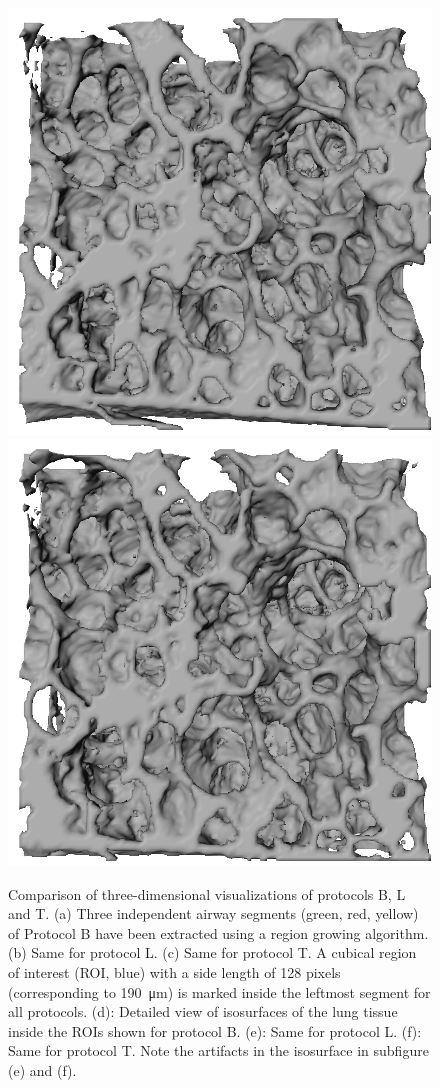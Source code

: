 \begin{figure}[htp]
		\includegraphics[width=\imagewidth]{img/comparisonBvsT/roiL}%
		\includegraphics[width=\imagewidth]{img/comparisonBvsT/roiT}%
		\caption{%
		Comparison of three-dimensional visualizations of protocols B, L and T. %
		(a) Three independent airway segments (green, red, yellow) of Protocol B have been extracted using a region growing algorithm. %
		(b) Same for protocol L. %
		(c) Same for protocol T. A cubical region of interest (ROI, blue) with a side length of 128 pixels (corresponding to \SI{190}{\micro\meter}) is marked inside the leftmost segment for all protocols. %
		(d): Detailed view of isosurfaces of the lung tissue inside the ROIs shown for protocol B. %
		(e): Same for protocol L.
		(f): Same for protocol T. Note the artifacts in the isosurface in subfigure (e) and (f).%
		}%
		\label{fig:BvsT}%
	\end{figure}
\fi
\twocolumn

